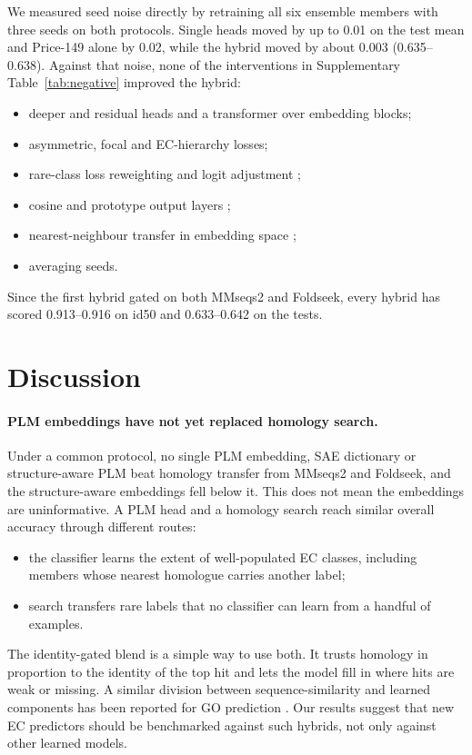 \documentclass[11pt]{article}
\begin{document}
We measured seed noise directly by retraining all six ensemble members with three seeds on both protocols. Single heads
moved by up to 0.01 on the test mean and Price-149 alone by 0.02, while the hybrid moved by about 0.003 (0.635--0.638).
Against that noise, none of the interventions in Supplementary Table~\ref{tab:negative} improved the hybrid:
\begin{itemize}
  \item deeper and residual heads and a transformer over embedding blocks;
  \item asymmetric, focal and EC-hierarchy losses;
  \item rare-class loss reweighting and logit adjustment \cite{menon2021};
  \item cosine and prototype output layers \cite{snell2017};
  \item nearest-neighbour transfer in embedding space \cite{littmann2021,schutze2022};
  \item averaging seeds.
\end{itemize}
Since the first hybrid gated on both MMseqs2 and Foldseek, every hybrid has scored 0.913--0.916 on id50 and 0.633--0.642
on the tests.

\section{Discussion}

\paragraph{PLM embeddings have not yet replaced homology search.}
Under a common protocol, no single PLM embedding, SAE dictionary or structure-aware PLM beat homology transfer from
MMseqs2 and Foldseek, and the structure-aware embeddings fell below it. This does not mean the embeddings are
uninformative. A PLM head and a homology search reach similar overall accuracy through different routes:
\begin{itemize}
  \item the classifier learns the extent of well-populated EC classes, including members whose nearest homologue
        carries another label;
  \item search transfers rare labels that no classifier can learn from a handful of examples.
\end{itemize}
The identity-gated blend is a simple way to use both. It trusts homology in proportion to the identity of the top hit
and lets the model fill in where hits are weak or missing. A similar division between sequence-similarity and learned
components has been reported for GO prediction \cite{deepgoplus}. Our results suggest that new EC predictors should be
benchmarked against such hybrids, not only against other learned models.
\end{document}
